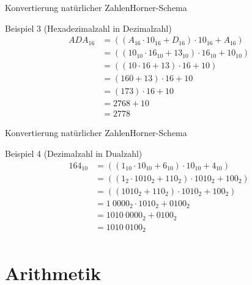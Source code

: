 \documentclass[xelatex,aspectratio=169]{beamer}
\begin{document}
\begin{frame}{Konvertierung natürlicher Zahlen}{Horner-Schema}
  \begin{exampleblock}{Beispiel 3 (Hexadezimalzahl in Dezimalzahl)}
    \begin{align*}
      ADA_{16} & = ((A_{16} \cdot 10_{16} + D_{16}) \cdot 10_{16} + A_{16})    \\
               & = ((10_{10} \cdot 16_{10} + 13_{10}) \cdot 16_{10} + 10_{10}) \\
               & = ((10 \cdot 16 + 13) \cdot 16 + 10)                          \\
               & = (160 + 13) \cdot 16 + 10                                    \\
               & = (173) \cdot 16 + 10                                         \\
               & = 2768 + 10                                                   \\
               & = 2778
    \end{align*}
  \end{exampleblock}
\end{frame}

\begin{frame}{Konvertierung natürlicher Zahlen}{Horner-Schema}
  \begin{exampleblock}{Beispiel 4 (Dezimalzahl in Dualzahl)}
    \begin{align*}
      164_{10} & = ((1_{10} \cdot 10_{10} + 6_{10}) \cdot 10_{10} + 4_{10})    \\
               & = ((1_{2} \cdot 1010_{2} + 110_{2}) \cdot 1010_{2} + 100_{2}) \\
               & = ((1010_{2} + 110_{2}) \cdot 1010_{2} + 100_{2})             \\
               & = 1~0000_{2} \cdot 1010_{2} + 0100_{2}                        \\
               & = 1010~0000_{2} + 0100_{2}                                    \\
               & = 1010~0100_{2}                                               \\
    \end{align*}
  \end{exampleblock}
\end{frame}


\section{Arithmetik}
\end{document}
